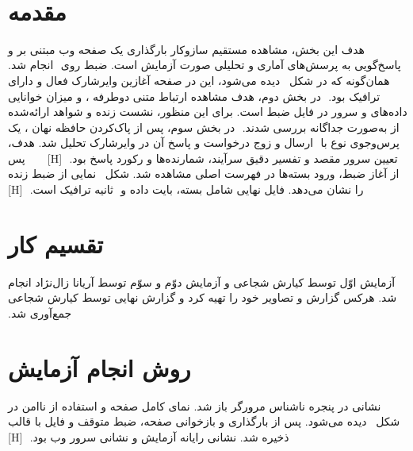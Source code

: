‫%
‫%
‫%
‫
‫\section{مقدمه}
‫
‫هدف این بخش، مشاهده مستقیم سازوکار بارگذاری یک صفحه وب مبتنی بر  و پاسخ‌گویی
‫به پرسش‌های آماری و تحلیلی صورت آزمایش است. ضبط روی 
‫ انجام شد.
‫همان‌گونه که در شکل~ دیده می‌شود، این  در صفحه آغازین وایرشارک
‫فعال و دارای ترافیک بود.
‫
‫در بخش دوم، هدف مشاهده ارتباط متنی دوطرفه ، 
‫و میزان خوانایی داده‌های  و سرور در فایل ضبط است. برای این منظور،
‫نشست زنده  و شواهد
‫ارائه‌شده از  به‌صورت جداگانه بررسی شدند.
‫
‫در بخش سوم، پس از پاک‌کردن حافظه نهان ، یک پرس‌وجوی نوع  با
‫ ارسال و زوج درخواست و پاسخ آن در وایرشارک تحلیل شد. هدف، تعیین سرور مقصد و
‫تفسیر دقیق سرآیند، شمارنده‌ها و رکورد پاسخ  بود.
‫
‫[H]
‫
‫
‫
‫
‫
‫پس از آغاز ضبط، ورود بسته‌ها در فهرست اصلی مشاهده شد. شکل~ نمایی از
‫ضبط زنده را نشان می‌دهد. فایل نهایی  شامل  بسته،  بایت داده و
‫ ثانیه ترافیک است.
‫
‫[H]
‫
‫
‫
‫
‫
‫\section{تقسیم کار}
‫
‫آزمایش اوّل توسط کیارش شجاعی و آزمایش دوّم و سوّم توسط آریانا زال‌نژاد انجام شد. هرکس گزارش‌ و تصاویر خود را تهیه کرد و گزارش نهایی توسط کیارش شجاعی جمع‌آوری شد.
‫
‫\section{روش انجام آزمایش}
‫
‫نشانی \href{http://sina.sharif.edu/\%7Eazad/}{}
‫در پنجره ناشناس مرورگر  باز شد.
‫نمای کامل صفحه و استفاده از  ناامن در شکل~ دیده می‌شود.
‫پس از بارگذاری و بازخوانی صفحه، ضبط متوقف و فایل با قالب  ذخیره شد. نشانی رایانه
‫آزمایش  و نشانی سرور وب  بود.
‫
‫[H]
‫
